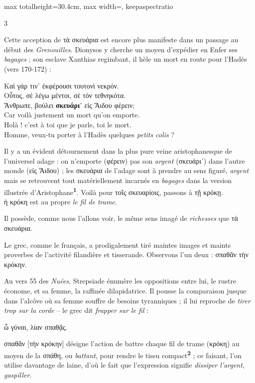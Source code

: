 \documentclass[11pt,twoside]{book}
\newcommand{\italique}[1]{\textit{#1}}
\newcommand{\citComm}[1]{\begin{quoting}[vskip=0.4pt,leftmargin=0.7em,rightmargin=0.2em]#1\end{quoting}}
\newcommand{\francais}[1]{{\policeFr #1}}
\newcommand{\grec}[1]{{\policeGr #1}}
\newcommand{\marqueur}[1]{\textsuperscript{\color{rubricRed}\textbf{#1}}}
\begin{document}
\begin{adjustbox}{max totalheight=30.4cm, max width=\textwidth, keepaspectratio}
\begin{minipage}{\textwidth}
{\begin{multicols}{3}
\par\vspace{1.5pt}
\noindent Cette acception de τὰ σκευάρια est encore plus manifeste dans un passage au début des \italique{Grenouilles}. Dionysos y cherche un moyen d'expédier en Enfer ses \italique{bagages} ; son esclave Xanthias regimbant, il hèle un mort en route pour l'Hadès (vers 170-172) :
\citComm{Καὶ γάρ τιν᾽ ἐκφέρουσι τουτονὶ νεκρόν.\\
Οὗτος, σὲ λέγω μέντοι, σὲ τὸν τεθνηκότα.\\
Ἄνθρωπε, βούλει \textbf{σκευάρι᾽} εἰς Ἅιδου φέρειν;\\
\francais{Car voilà justement un mort qu'on emporte.\\
Holà ! c'est à toi que je parle, toi le mort.\\
Homme, veux-tu porter à l'Hadès quelques \italique{petits colis} ?}}
\par\vspace{1.5pt}
\noindent Il y a un évident détournement dans la plus pure veine aristophanesque de l'universel adage : on n'emporte (φέρειν) pas son \italique{argent} (σκευάρι᾽) dans l'autre monde (εἰς Ἅιδου) ; les σκευάρια de l'adage sont à prendre au sens figuré, \italique{argent} mais se retrouvent tout matériellement incarnés en \italique{bagages} dans la version illustrée d'Aristophane\marqueur{1}. Voilà pour τοῖς σκευαρίοις, passons à τῇ κρόκῃ.\\ \grec{ἡ κρόκη} est au propre \italique{le fil de trame}.
\par\vspace{1.5pt}
\noindent Il possède, comme nous l'allons voir, le même sens imagé de \italique{richesses} que τὰ σκευάρια.
\par\vspace{1.5pt}
\noindent Le grec, comme le français, a prodigalement tiré maintes images et maints proverbes de l'activité filandière et tisserande. Observons l'un deux : σπαθᾶν τὴν κρόκην.
\par\vspace{1.5pt}
\noindent Au vers 55 des \italique{Nuées}, Strepsiade énumère les oppositions entre lui, le rustre économe, et sa femme, la raffinée dilapidatrice. Il pousse la comparaison jusque dans l'alcôve où sa femme souffre de besoins tyranniques ; il lui reproche de \italique{tirer trop sur la corde} -- le grec dit \italique{frapper sur le fil} :
\citComm{ὦ γύναι, λίαν σπαθᾷς.}
\par\vspace{1.5pt}
\noindent σπαθᾶν [τὴν κρόκην] désigne l'action de battre chaque fil de trame (κρόκη) au moyen de la σπάθη, ou \italique{battant}, pour rendre le tissu compact\marqueur{2} ; ce faisant, l'on utilise davantage de laine, d'où le fait que l'expression signifie \italique{dissiper l'argent}, \italique{gaspiller}.

\end{multicols}}
\end{minipage}
\end{adjustbox}
\end{document}
